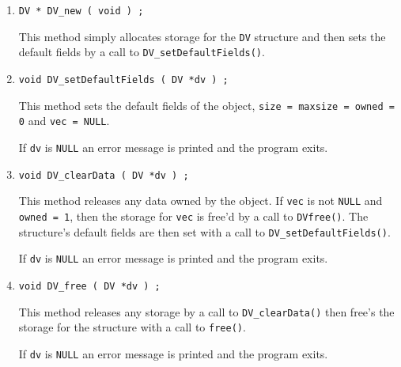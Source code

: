 \begin{enumerate}
\item
\begin{verbatim}
DV * DV_new ( void ) ;
\end{verbatim}
This method simply allocates storage for the {\tt DV} structure 
and then sets the default fields by a call to 
{\tt DV\_setDefaultFields()}.
\item
\begin{verbatim}
void DV_setDefaultFields ( DV *dv ) ;
\end{verbatim}
This method sets the default fields of the object,
{\tt size = maxsize = owned = 0} and {\tt vec = NULL}.
\par {}
If {\tt dv} is {\tt NULL}
an error message is printed and the program exits.
\item
\begin{verbatim}
void DV_clearData ( DV *dv ) ;
\end{verbatim}
This method releases any data owned by the object. 
If {\tt vec} is not {\tt NULL} and {\tt owned = 1},
then the storage for {\tt vec} is free'd by a call to
{\tt DVfree()}.
The structure's default fields are then set 
with a call to {\tt DV\_setDefaultFields()}.
\par {}
If {\tt dv} is {\tt NULL}
an error message is printed and the program exits.
\item
\begin{verbatim}
void DV_free ( DV *dv ) ;
\end{verbatim}
This method releases any storage by a call to 
{\tt DV\_clearData()} then free's the storage for the 
structure with a call to {\tt free()}.
\par {}
If {\tt dv} is {\tt NULL}
an error message is printed and the program exits.
\end{enumerate}
\par
